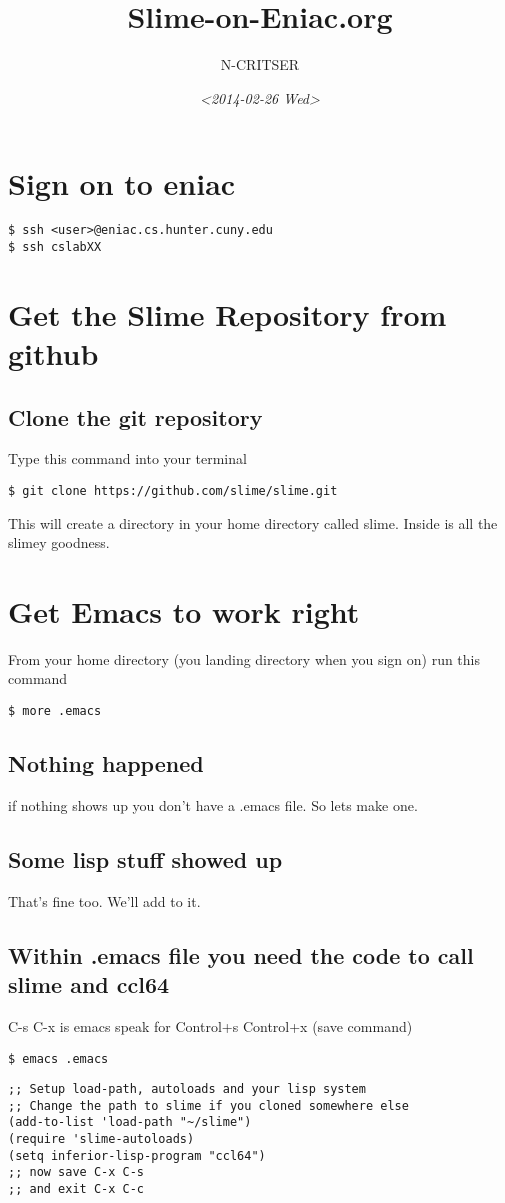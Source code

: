 \documentclass[11pt]{article}
\author{N-CRITSER}
\date{\textit{<2014-02-26 Wed>}}
\title{Slime-on-Eniac.org}
\begin{document}
\maketitle
\tableofcontents



\section{Sign on to eniac}
\label{sec-1}
\begin{verbatim}
$ ssh <user>@eniac.cs.hunter.cuny.edu
$ ssh cslabXX
\end{verbatim}
\section{Get the Slime Repository from github}
\label{sec-2}
\subsection{Clone the git repository}
\label{sec-2-1}
Type this command into your terminal
\begin{verbatim}
$ git clone https://github.com/slime/slime.git
\end{verbatim}

This will create a directory in your home directory
called slime.  Inside is all the slimey goodness. 
\section{Get Emacs to work right}
\label{sec-3}
From your home directory (you landing directory when you sign on)
run this command
\begin{verbatim}
$ more .emacs
\end{verbatim}
\subsection{Nothing happened}
\label{sec-3-1}
if nothing shows up you don't have a .emacs file.  
So lets make one.  

\subsection{Some lisp stuff showed up}
\label{sec-3-2}
That's fine too. We'll add to it. 

\subsection{Within .emacs file you need the code to call slime and ccl64}
\label{sec-3-3}
C-s C-x is emacs speak for Control+s Control+x (save command) 
\begin{verbatim}
$ emacs .emacs
\end{verbatim}
\begin{verbatim}
;; Setup load-path, autoloads and your lisp system
;; Change the path to slime if you cloned somewhere else
(add-to-list 'load-path "~/slime")
(require 'slime-autoloads)
(setq inferior-lisp-program "ccl64")
;; now save C-x C-s  
;; and exit C-x C-c
\end{verbatim}
\end{document}
